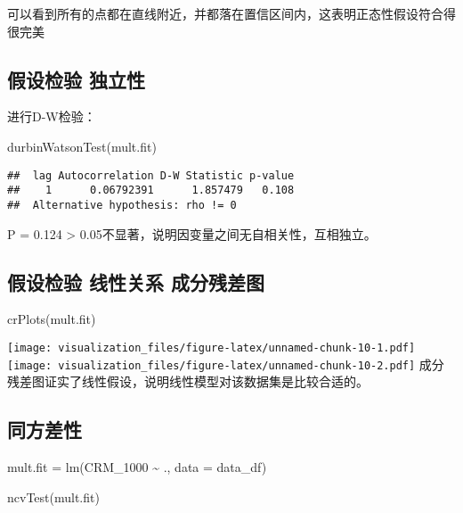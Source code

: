 \documentclass[
]{article}
\newenvironment{Shaded}{\begin{snugshade}}{\end{snugshade}}
\newcommand{\AttributeTok}[1]{\textcolor[rgb]{0.77,0.63,0.00}{#1}}
\newcommand{\FunctionTok}[1]{\textcolor[rgb]{0.00,0.00,0.00}{#1}}
\newcommand{\NormalTok}[1]{#1}
\newcommand{\OtherTok}[1]{\textcolor[rgb]{0.56,0.35,0.01}{#1}}
\newcommand{\SpecialCharTok}[1]{\textcolor[rgb]{0.00,0.00,0.00}{#1}}
\begin{document}
可以看到所有的点都在直线附近，并都落在置信区间内，这表明正态性假设符合得很完美

\hypertarget{ux5047ux8bbeux68c0ux9a8c-ux72ecux7acbux6027}{%
\subsection{假设检验
独立性}\label{ux5047ux8bbeux68c0ux9a8c-ux72ecux7acbux6027}}

进行D-W检验：

\begin{Shaded}
\begin{Highlighting}[]
\FunctionTok{durbinWatsonTest}\NormalTok{(mult.fit)}
\end{Highlighting}
\end{Shaded}

\begin{verbatim}
##  lag Autocorrelation D-W Statistic p-value
##    1      0.06792391      1.857479   0.108
##  Alternative hypothesis: rho != 0
\end{verbatim}

P = 0.124 \textgreater{}
0.05不显著，说明因变量之间无自相关性，互相独立。

\hypertarget{ux5047ux8bbeux68c0ux9a8c-ux7ebfux6027ux5173ux7cfb-ux6210ux5206ux6b8bux5deeux56fe}{%
\subsection{假设检验 线性关系
成分残差图}\label{ux5047ux8bbeux68c0ux9a8c-ux7ebfux6027ux5173ux7cfb-ux6210ux5206ux6b8bux5deeux56fe}}

\begin{Shaded}
\begin{Highlighting}[]
\FunctionTok{crPlots}\NormalTok{(mult.fit) }
\end{Highlighting}
\end{Shaded}

\texttt{[image: visualization\_files/figure-latex/unnamed-chunk-10-1.pdf]}
\texttt{[image: visualization\_files/figure-latex/unnamed-chunk-10-2.pdf]}
成分残差图证实了线性假设，说明线性模型对该数据集是比较合适的。

\hypertarget{ux540cux65b9ux5deeux6027}{%
\subsection{同方差性}\label{ux540cux65b9ux5deeux6027}}

\begin{Shaded}
\begin{Highlighting}[]
\NormalTok{mult.fit }\OtherTok{=} \FunctionTok{lm}\NormalTok{(CRM\_1000 }\SpecialCharTok{\textasciitilde{}}\NormalTok{ ., }\AttributeTok{data =}\NormalTok{ data\_df)}

\FunctionTok{ncvTest}\NormalTok{(mult.fit)}
\end{Highlighting}
\end{Shaded}
\end{document}
